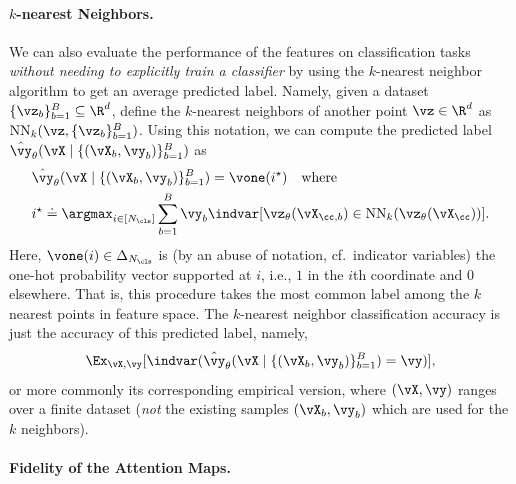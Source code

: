 \documentclass[../../book-main.tex]{subfiles}
\begin{document}
\paragraph{\(k\)-nearest Neighbors.}  We can also evaluate the
performance of the features on classification tasks \textit{without
needing to explicitly train a classifier} by using the \(k\)-nearest
neighbor algorithm to get an average predicted label.
Namely, given a
dataset \(\{\vz_{b}\}_{b = 1}^{B} \subseteq \R^{d}\), define the
\(k\)-nearest neighbors of another point \(\vz \in \R^{d}\) as
\(\operatorname{NN}_{k}(\vz, \{\vz_{b}\}_{b = 1}^{B})\).
Using this
notation, we can compute the predicted label \(\hat{\vy}_{\theta}(\vX
\mid \{(\vX_{b}, \vy_{b})\}_{b = 1}^{B})\) as
\begin{align}
&\hat{\vy}_{\theta}(\vX \mid \{(\vX_{b}, \vy_{b})\}_{b = 1}^{B}) =
\vone(i^{\star}) \quad \text{where} \nonumber \\
& i^{\star} \doteq \argmax_{i \in [N_{\cls}]}\sum_{b =
1}^{B}\vy_{b}\indvar[\vz_{\theta}(\vX_{\cc, b}) \in
\operatorname{NN}_{k}(\vz_{\theta}(\vX_{\cc}))] .
\end{align}
Here, \(\vone(i) \in \Delta_{N_{\cls}}\) is (by an abuse of notation,
cf.~indicator variables) the one-hot probability vector supported at
\(i\), i.e., \(1\) in the \(i\)th coordinate and \(0\) elsewhere.
That is, this procedure takes the most common label among the \(k\)
nearest points in feature space.
The \(k\)-nearest neighbor
classification accuracy is just the accuracy of this predicted label, namely,
\begin{equation}
\Ex_{\vX, \vy}[\indvar(\hat{\vy}_{\theta}(\vX \mid \{(\vX_{b},
\vy_{b})\}_{b = 1}^{B}) = \vy)] ,
\end{equation}
or more commonly its corresponding empirical version, where \((\vX,
\vy)\) ranges over a finite dataset (\textit{not} the existing
samples \((\vX_{b}, \vy_{b})\) which are used for the \(k\) neighbors).

\paragraph{Fidelity of the Attention Maps.}
\end{document}
